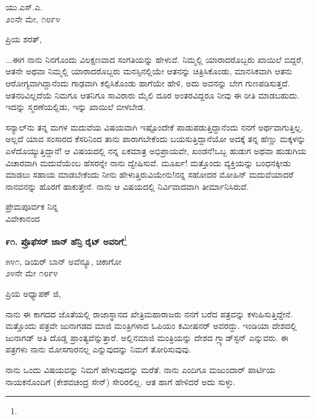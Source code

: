 \begin{flushright}
ಯು.ಎಸ್.ಎ.\\೨೦ನೇ ಮೇ, ೧೮೯೪
\end{flushright}

\noindent
ಪ್ರಿಯ ಶರತ್,

...ಈಗ ನಾನು ನಿನಗೊಂದು ವಿಲಕ್ಷಣವಾದ ಸಂಗತಿಯನ್ನು ಹೇಳುವೆ. ನಿಮ್ಮಲ್ಲಿ ಯಾರಾದರೊಬ್ಬರು ಖಾಯಿಲೆ ಬಿದ್ದರೆ, ಆತನೇ ಅಥವಾ ನಿಮ್ಮಲ್ಲಿ ಯಾರಾದರೊಬ್ಬರು ಮನಸ್ಸಿನಲ್ಲಿಯೇ ಆತನನ್ನು ಚಿತ್ರಿಸಿಕೊಂಡು, ಮಾನಸಿಕವಾಗಿ ಆತನು ಆರೋಗ್ಯವಾಗಿದ್ದಾನೆಂದು ಗಾಢವಾಗಿ ಕಲ್ಪಿಸಿಕೊಂಡು ಹಾಗೆಯೇ ಹೇಳಿ, ಅದು ಅವನನ್ನು ಬೇಗ ಗುಣಪಡಿಸುತ್ತದೆ. ಆತನರಿವಿಲ್ಲದೆಯೆ ನಿಮಗೂ ಆತನಿಗೂ ಸಾವಿರಾರು ಮೈಲಿ ದೂರ ಅಂತರವಿದ್ದರೂ ನೀವು ಈ ರೀತಿ ಮಾಡಬಹುದು. ಇದನ್ನು ಸ್ಮರಣೆಯಲ್ಲಿಡು, ಇನ್ನು ಖಾಯಿಲೆ ಬೀಳಬೇಡ.

\vspace{0.2cm}

ಸನ್ಯಾಲ್‌ನು ತನ್ನ ಮಗಳ ಮದುವೆಯ ವಿಷಯವಾಗಿ ಇಷ್ಟೊಂದೇಕೆ ಪಾಡುಪಡುತ್ತಿದ್ದಾನೆಂದು ನನಗೆ ಅರ್ಥವಾಗುತ್ತಿಲ್ಲ. ಅಲ್ಲದೆ ಯಾವ ಸಂಸಾರದ ಕೆಸರಿನಿಂದ ತಾನು ಪಾರಾಗಬೇಕೆಂದು ಬಯಸುತ್ತಿದ್ದಾನೆಯೋ ಅದಕ್ಕೆ ತನ್ನ ಹೆಣ್ಣು ಮಕ್ಕಳನ್ನು ಎಳೆದೊಯ್ಯುತ್ತಿದ್ದಾನೆ! ಆ ವಿಷಯದಲ್ಲಿ ನನ್ನ ಏಕಮಾತ್ರ ಅಭಿಪ್ರಾಯವೇ, ಖಂಡನೆ!ಒಬ್ಬ ಹುಡುಗ ಅಥವಾ ಹುಡುಗಿಯ ವಿಚಾರವಾಗಿ ಮದುವೆಯೆಂಬ ಹೆಸರನ್ನೇ ನಾನು ದ್ವೇಷಿಸುವೆ. ಮೂರ್ಖ! ಮತ್ತೊಂದು ವ್ಯಕ್ತಿಯನ್ನು ಬಂಧನಕ್ಕೀಡು ಮಾಡಲು ಸಹಾಯ ಮಾಡಬೇಕೆಂದು ನೀನು ಹೇಳುತ್ತಿರುವಿಯೇನು!ನನ್ನ ಸಹೋದರ ಮೋಹಿನ್ ಮದುವೆಯಾದರೆ ನಾನವನನ್ನು ಹೊರಗೆ ಹಾಕುತ್ತೇನೆ. ನಾನು ಆ ವಿಷಯದಲ್ಲಿ ನಿರ್ವಿವಾದವಾಗಿ ತೀರ್ಮಾನಿಸಿರುವೆ.

{\flushright
ಪ್ರೇಮಪೂರ್ವಕ ನಿನ್ನ\\ವಿವೇಕಾನಂದ\par}

\newpage

\begin{center}
\textbf{೯೧. ಪ್ರೊಫೆಸರ್ ಜಾನ್ ಹೆನ್ರಿ ರೈಟ್ ಅವರಿಗೆ}\footnote{}
\end{center}

\begin{flushright}
೫೪೧, ಡಿಯರ್ ಬಾನ್ ಅವೆನ್ಯೂ, ಚಿಕಾಗೋ\\೨೪ನೇ ಮೇ ೧೮೯೪
\end{flushright}

\noindent
ಪ್ರಿಯ ಅಧ್ಯಾಪಕ್ ಜಿ,

ನಾನು ಈ ಕಾಗದದ ಜೊತೆಯಲ್ಲಿ ರಾಜಾಸ್ಥಾನದ ಖೇತ್ರಿಮಹಾರಾಜರು ನನಗೆ ಬರೆದ ಪತ್ರವನ್ನು ಕಳುಹಿಸುತ್ತಿದ್ದೇನೆ. ಮತ್ತೊಂದು ಪತ್ರವೇ ಜುನಾಗಡದ ಮಾಜಿ ಮಂತ್ರಿಗಳಾದ ಓಪಿಯಂ ಕಮೀಷನರ್ ಅವರದ್ದು. ಇಂಡಿಯಾ ದೇಶದಲ್ಲಿ ಜುನಾಗಡ್ ಅತಿ ದೊಡ್ಡ ಪ್ರಾಂತ್ಯವೆನ್ನುತ್ತಾರೆ. ಅಲ್ಲಿನಮಾಜಿ ಮಂತ್ರಿಯನ್ನು ದೇಶದ ಗ್ಲ್ಯಾಡ್‌ಸ್ಟನ್ ಎನ್ನುವರು. ಈ ಪತ್ರಗಳು ನಾನು ಮೋಸಗಾರನಲ್ಲ ಎನ್ನುವುದನ್ನು ನಿಮಗೆ ತೋರಿಸುವುವು.

ನಾನು ಒಂದು ವಿಷಯವನ್ನು ನಿಮಗೆ ಹೇಳುವುದನ್ನು ಮರೆತೆ. ನಾನು ಎಂದಿಗೂ ಮಜುಂದಾರ್ ಪಾರ್ಟಿಯ ನಾಯಕನೊಂದಿಗೆ (ಕೇಶವಚಂದ್ರ ಸೇನ್) ಸೇರಿರಲಿಲ್ಲ. ಆತ ಹಾಗೆ ಹೇಳಿದರೆ ಅದು ಸುಳ್ಳು.

